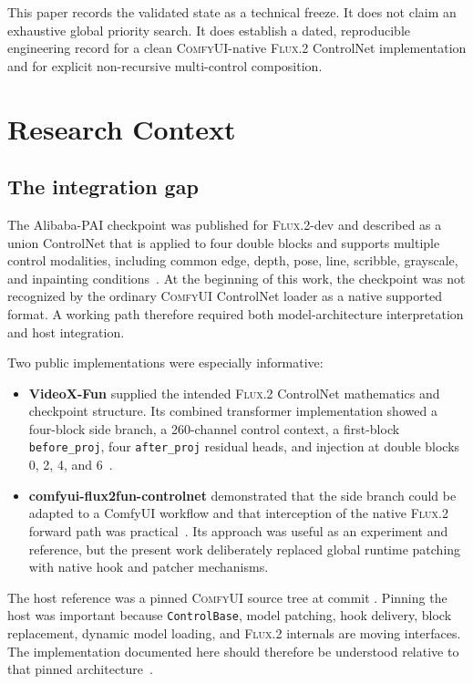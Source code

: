 \documentclass[11pt]{article}
\newcommand{\FluxTwo}{\textsc{Flux.2}}
\newcommand{\ComfyUI}{\textsc{ComfyUI}}
\newcommand{\code}[1]{\texttt{#1}}
\begin{document}
This paper records the validated state as a technical freeze. It does not claim an exhaustive global priority search. It does establish a dated, reproducible engineering record for a clean \ComfyUI-native \FluxTwo{} ControlNet implementation and for explicit non-recursive multi-control composition.

\section{Research Context}

\subsection{The integration gap}

The Alibaba-PAI checkpoint was published for \FluxTwo{}-dev and described as a union ControlNet that is applied to four double blocks and supports multiple control modalities, including common edge, depth, pose, line, scribble, grayscale, and inpainting conditions~\cite{alibaba_flux2_controlnet}. At the beginning of this work, the checkpoint was not recognized by the ordinary \ComfyUI{} ControlNet loader as a native supported format. A working path therefore required both model-architecture interpretation and host integration.

Two public implementations were especially informative:

\begin{itemize}
  \item \textbf{VideoX-Fun} supplied the intended \FluxTwo{} ControlNet mathematics and checkpoint structure. Its combined transformer implementation showed a four-block side branch, a 260-channel control context, a first-block \code{before\_proj}, four \code{after\_proj} residual heads, and injection at double blocks 0, 2, 4, and 6~\cite{videoxfun}.
  \item \textbf{comfyui-flux2fun-controlnet} demonstrated that the side branch could be adapted to a ComfyUI workflow and that interception of the native \FluxTwo{} forward path was practical~\cite{flux2fun}. Its approach was useful as an experiment and reference, but the present work deliberately replaced global runtime patching with native hook and patcher mechanisms.
\end{itemize}

The host reference was a pinned \ComfyUI{} source tree at commit
. Pinning the host was important because \code{ControlBase}, model patching, hook delivery, block replacement, dynamic model loading, and \FluxTwo{} internals are moving interfaces. The implementation documented here should therefore be understood relative to that pinned architecture~\cite{comfyui_pinned}.
\end{document}
